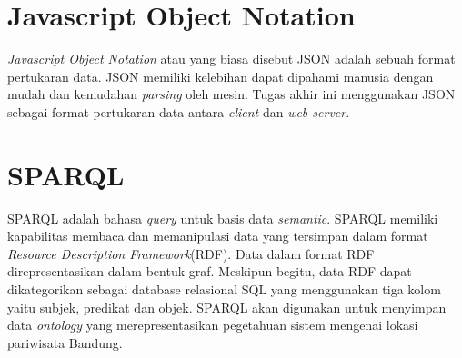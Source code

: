 \section{Javascript Object Notation}
\textit{Javascript Object Notation} atau yang biasa disebut JSON adalah sebuah format pertukaran data. JSON memiliki kelebihan dapat dipahami manusia dengan mudah dan kemudahan \textit{parsing} oleh mesin. 
\newline
Tugas akhir ini menggunakan JSON sebagai format pertukaran data antara \textit{client} dan \textit{web server}.

\section{SPARQL}
SPARQL adalah bahasa \textit{query} untuk basis data \textit{semantic}. SPARQL memiliki kapabilitas membaca dan memanipulasi data yang tersimpan dalam format \textit{Resource Description Framework}(RDF). Data dalam format RDF direpresentasikan dalam bentuk graf. Meskipun begitu, data RDF dapat dikategorikan sebagai database relasional SQL yang menggunakan tiga kolom yaitu subjek, predikat dan objek.
SPARQL akan digunakan untuk menyimpan data \textit{ontology} yang merepresentasikan pegetahuan sistem mengenai lokasi pariwisata Bandung. 
 